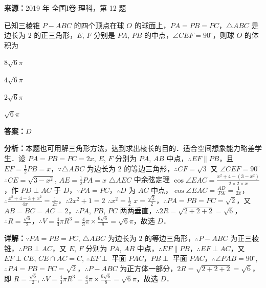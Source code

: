 \begin{question}[points=5]
\textbf{来源：}2019 年 全国I卷-理科，第 12 题\par
已知三棱锥 $P-ABC$ 的四个顶点在球 $O$ 的球面上，$PA = PB = PC$，$\triangle ABC$ 是边长为 $2$ 的正三角形，$E$, $F$ 分别是 $PA$, $PB$ 的中点，$\angle CEF = 90^\circ$，则球 $O$ 的体积为
\begin{choices}
  \item $8\sqrt{6}\pi$
  \item $4\sqrt{6}\pi$
  \item $2\sqrt{6}\pi$
  \item $\sqrt{6}\pi$
\end{choices}
\begin{solution}
\textbf{答案：}$D$

\textbf{分析：}本题也可用解三角形方法，达到求出棱长的目的．适合空间想象能力略差学生．设 $PA = PB = PC = 2x$, $E$, $F$ 分别为 $PA$, $AB$ 中点，$\therefore EF \parallel PB$，且 $EF = \frac{1}{2}PB = x$，$\because \triangle ABC$ 为边长为 $2$ 的等边三角形，$\therefore CF = \sqrt{3}$ 又 $\angle CEF = 90^\circ$ $\therefore CE = \sqrt{3 - x^2}$, $AE = \frac{1}{2}PA = x$ $\triangle AEC$ 中余弦定理 $\cos \angle EAC = \frac{x^2 + 4 - (3 - x^2)}{2 \times 2 \times x}$，作 $PD \perp AC$ 于 $D$，$\because PA = PC$，$\therefore D$ 为 $AC$ 中点，$\cos \angle EAC = \frac{AD}{PA} = \frac{1}{2x}$，$\therefore \frac{x^2 + 4 - 3 + x^2}{4x} = \frac{1}{2x}$，$\therefore 2x^2 + 1 = 2$ $\therefore x^2 = \frac{1}{2}$ $x = \frac{\sqrt{2}}{2}$，$\therefore PA = PB = PC = \sqrt{2}$，又 $AB = BC = AC = 2$，$\therefore PA$, $PB$, $PC$ 两两垂直，$\therefore 2R = \sqrt{2 + 2 + 2} = \sqrt{6}$，$\therefore R = \frac{\sqrt{6}}{2}$，$\therefore V = \frac{4}{3}\pi R^3 = \frac{4}{3}\pi \times \frac{6\sqrt{6}}{8} = \sqrt{6}\pi$，故选 $D$．

\textbf{详解：}$\because PA = PB = PC$, $\triangle ABC$ 为边长为 $2$ 的等边三角形，$\therefore P-ABC$ 为正三棱锥，$\therefore PB \perp AC$，又 $E$, $F$ 分别为 $PA$, $AB$ 中点，$\therefore EF \parallel PB$，$\therefore EF \perp AC$，又 $EF \perp CE$, $CE \cap AC = C$, $\therefore EF \perp$ 平面 $PAC$，$PB \perp$ 平面 $PAC$，$\therefore \angle PAB = 90^\circ$, $\therefore PA = PB = PC = \sqrt{2}$，$\therefore P-ABC$ 为正方体一部分，$2R = \sqrt{2 + 2 + 2} = \sqrt{6}$，即 $R = \frac{\sqrt{6}}{2}$, $\therefore V = \frac{4}{3}\pi R^3 = \frac{4}{3}\pi \times \frac{6\sqrt{6}}{8} = \sqrt{6}\pi$，故选 $D$．
\end{solution}
\end{question}

